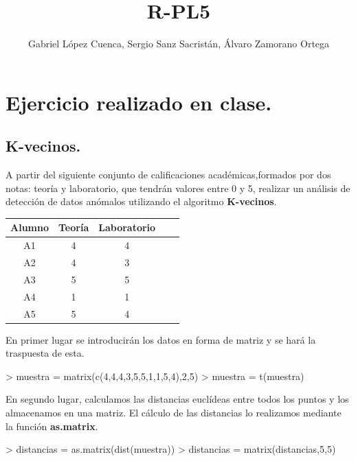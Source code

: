 \documentclass [a4paper] {article}
\title{R-PL5}
\author{Gabriel López Cuenca, Sergio Sanz Sacristán, Álvaro Zamorano Ortega}
\begin{document}


\maketitle

\graphicspath{ {./tmp/} }

\section{Ejercicio realizado en clase.}

\subsection{K-vecinos.}
\bigskip
A partir del siguiente conjunto de calificaciones académicas,formados por dos notas: teoría y laboratorio, 
que tendrán valores entre 0 y 5, realizar un análisis de detección de datos anómalos utilizando el algoritmo
\textbf{K-vecinos}.

\begin{table}[H]
\begin{center}
\begin{tabular}{|c|c|c|c|c|}
\hline
Alumno & Teoría & Laboratorio\\
\hline \hline
A1 & 4 & 4 \\ \hline
A2 & 4 & 3 \\ \hline
A3 & 5 & 5 \\ \hline
A4 & 1 & 1 \\ \hline
A5 & 5 & 4 \\ \hline
\end{tabular}
\end{center}
\end{table}

En primer lugar se introducirán los datos en forma de matriz y se hará la traspuesta de esta.
\begin{Schunk}
\begin{Sinput}
> muestra = matrix(c(4,4,4,3,5,5,1,1,5,4),2,5)
> muestra = t(muestra)
\end{Sinput}
\end{Schunk}

\bigskip
En segundo lugar, calculamos las distancias euclídeas entre todos los puntos y los almacenamos 
en una matriz. El cálculo de las distancias lo realizamos mediante la función \textbf{as.matrix}. 

\bigskip
\begin{Schunk}
\begin{Sinput}
> distancias = as.matrix(dist(muestra))
> distancias = matrix(distancias,5,5)
\end{Sinput}
\end{Schunk}
\end{document}
